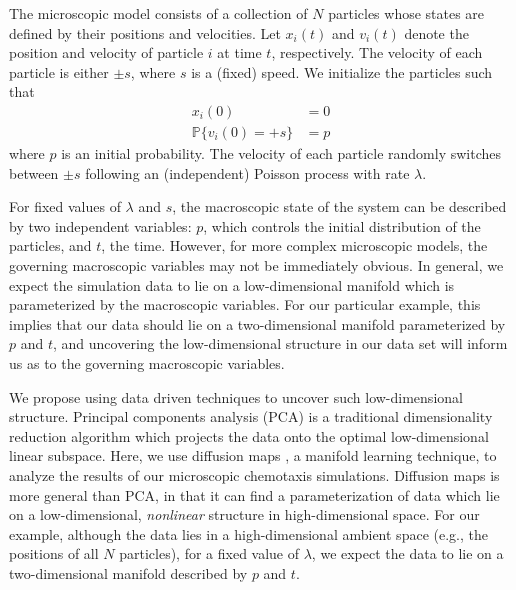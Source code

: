 \documentclass[prl, reprint, final, showkeys]{revtex4-1}
\begin{document}
The microscopic model consists of a collection of $N$ particles whose states are defined by their positions and velocities. 
%
Let $x_i(t)$ and $v_i(t)$ denote the position and velocity of particle $i$ at time $t$, respectively.
%
The velocity of each particle is either $\pm s$, where $s$ is a (fixed) speed. 
%
We initialize the particles such that
\begin{equation}\label{eqn:system}
\begin{aligned}
x_i(0) & = 0 \\
\mathbb{P} \{ v_i(0) = +s \} & = p
\end{aligned}
\end{equation}
where $p$ is an initial probability.
%
The velocity of each particle randomly switches between $\pm s$ following an (independent) Poisson process with rate $\lambda$.
%


For fixed values of $\lambda$ and $s$, the macroscopic state of the system can be described by two independent variables: $p$, which controls the initial distribution of the particles, and $t$, the time.
%
However, for more complex microscopic models, the governing macroscopic variables may not be immediately obvious.
%
In general, we expect the simulation data to lie on a low-dimensional manifold which is parameterized by the macroscopic variables.
%
For our particular example, this implies that our data should lie on a two-dimensional manifold  parameterized by $p$ and $t$, 
and uncovering the low-dimensional structure in our data set will inform us as to the governing macroscopic variables.

We propose using data driven techniques to uncover such low-dimensional structure.
%
Principal components analysis (PCA) \cite{...} is a traditional dimensionality reduction algorithm which projects the data onto the optimal low-dimensional linear subspace. 
%
Here, we use diffusion maps \cite{coifman2005geometric}, a manifold learning technique, to analyze the results of our microscopic chemotaxis simulations.
%
Diffusion maps is more general than PCA, in that it can find a parameterization of data which lie on a low-dimensional, {\em nonlinear} structure in high-dimensional space.
%
For our example, although the data lies in a high-dimensional ambient space (e.g., the positions of all $N$ particles), for a fixed value of $\lambda$, we expect the data to lie on a two-dimensional manifold described by $p$ and $t$.
%
\end{document}
